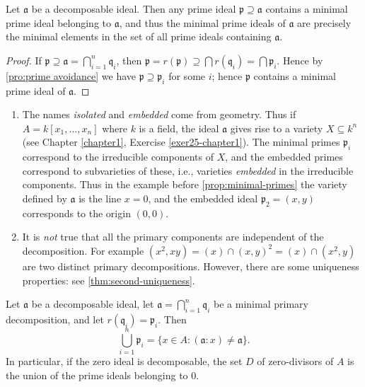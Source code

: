 \begin{proposition}\label{prop:minimal-primes}
    Let $\mathfrak{a}$ be a decomposable ideal. Then any prime ideal $\mathfrak{p} \supseteq \mathfrak{a}$ contains a minimal prime ideal belonging to $\mathfrak{a}$, and thus the minimal prime ideals of $\mathfrak{a}$ are precisely the minimal elements in the set of all prime ideals containing $\mathfrak{a}$.
\end{proposition}

\begin{proof}
    If $\mathfrak{p} \supseteq \mathfrak{a} = \bigcap_{i=1}^n \mathfrak{q}_i$, then $\mathfrak{p} = r(\mathfrak{p}) \supseteq \bigcap r(\mathfrak{q}_i) = \bigcap \mathfrak{p}_i$. Hence by \eqref{pro:prime avoidance} we have $\mathfrak{p} \supseteq \mathfrak{p}_i$ for some $i$; hence $\mathfrak{p}$ contains a minimal prime ideal of $\mathfrak{a}$.
\end{proof}

\begin{remarks}
    \begin{enumerate}[1)]
        \item The names \emph{isolated} and \emph{embedded} come from geometry. Thus if $A = k[x_1, \ldots, x_n]$ where $k$ is a field, the ideal $\mathfrak{a}$ gives rise to a variety $X \subseteq k^n$ (see Chapter \ref{chapter1}, Exercise \ref{exer25-chapter1}). The minimal primes $\mathfrak{p}_i$ correspond to the irreducible components of $X$, and the embedded primes correspond to subvarieties of these, i.e., varieties \emph{embedded} in the irreducible components. Thus in the example before \eqref{prop:minimal-primes} the variety defined by $\mathfrak{a}$ is the line $x=0$, and the embedded ideal $\mathfrak{p}_2=(x,y)$ corresponds to the origin $(0,0)$.
        \item It is \emph{not} true that all the primary components are independent of the decomposition. For example $(x^2,xy)=(x)\cap (x,y)^2=(x)\cap (x^2,y)$ are two distinct primary decompositions. However, there are some uniqueness properties: see \eqref{thm:second-uniqueness}.
    \end{enumerate}
\end{remarks}

\begin{proposition}\label{pro:zero-divisors-union-primes}
    Let $\mathfrak{a}$ be a decomposable ideal, let $\mathfrak{a} = \bigcap_{i=1}^n \mathfrak{q}_i$ be a minimal primary decomposition, and let $r(\mathfrak{q}_i) = \mathfrak{p}_i$. Then
    \[
    \bigcup_{i=1}^n \mathfrak{p}_i = \{ x \in A : (\mathfrak{a} : x) \neq \mathfrak{a} \}.
    \]
    In particular, if the zero ideal is decomposable, the set $D$ of zero-divisors of $A$ is the union of the prime ideals belonging to $0$.
\end{proposition}

